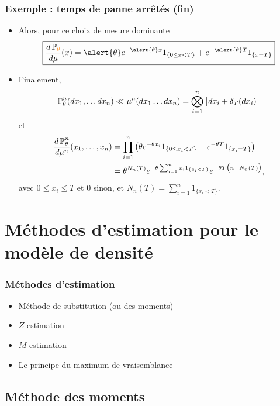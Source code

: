 \begin{frame}
\frametitle{Exemple : temps de panne  arrêtés (fin)}
\begin{itemize}
\item Alors, pour ce choix de mesure dominante
$$\boxed{\frac{d\PP_{\tco{\theta}}}{d\mu}(x) = \alert{\theta} e^{-\alert{\theta} x} 1_{\{0 \leq x < T\}} +  e^{-\alert{\theta} T}1_{\{x=T\}}}$$
\item Finalement,
$$\operatorname{{\mathbb P}}_\theta^n(dx_1,\ldots dx_n)
\ll \mu^n(dx_1 \ldots dx_n) = \bigotimes_{i = 1}^n \big[dx_i +
\delta_{T}(dx_i)\big]
$$
et
\begin{align*}
\frac{d\operatorname{{\mathbb P}}_\theta^n}{d\mu^n}(x_1,\ldots, x_n) & = \prod_{i = 1}^n \big(\theta e^{-\theta x_i} 1_{\{0 \leq x_i < T\}} +  e^{-\theta T}1_{\{x_i=T\}}\big) \\
& = \theta^{N_n(T)} e^{-\theta \sum_{i = 1}^{n}x_i 1_{\{x_i<T\}}}e^{-\theta T\big(n-N_n(T)\big)},
\end{align*}
\alert{ avec $0 \leq x_i \leq T$} et $0$ sinon, et  $N_n(T) = \sum_{i = 1}^n1_{\{x_i < T\}}$.
\end{itemize}
\end{frame}




\section{Méthodes d'estimation pour le modèle de densité}


\begin{frame}
\frametitle{Méthodes d'estimation }
\begin{itemize}
\item Méthode de substitution (ou des moments)
\item $Z$-estimation
\item $M$-estimation
\item Le principe du \alert{ maximum de vraisemblance}
\end{itemize}
\end{frame}


\subsection{Méthode des moments}

